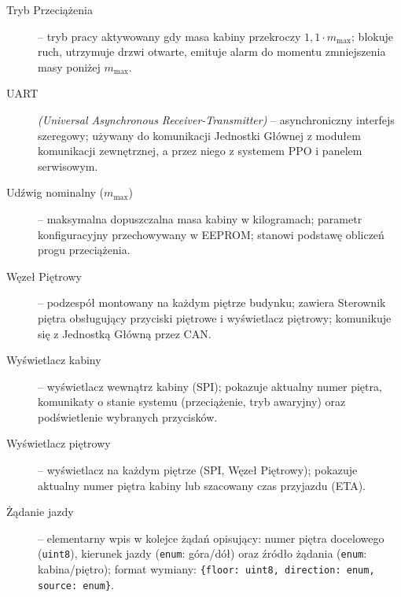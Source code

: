 \documentclass{article}
\begin{document}
\begin{description}
  \item[Tryb Przeciążenia] – tryb pracy aktywowany gdy masa kabiny przekroczy $1{,}1 \cdot m_\text{max}$; blokuje ruch, utrzymuje drzwi otwarte, emituje alarm do momentu zmniejszenia masy poniżej $m_\text{max}$.

  \item[UART] \textit{(Universal Asynchronous Receiver-Transmitter)} – asynchroniczny interfejs szeregowy; używany do komunikacji Jednostki Głównej z modułem komunikacji zewnętrznej, a przez niego z systemem PPO i panelem serwisowym.

  \item[Udźwig nominalny ($m_\text{max}$)] – maksymalna dopuszczalna masa kabiny w kilogramach; parametr konfiguracyjny przechowywany w EEPROM; stanowi podstawę obliczeń progu przeciążenia.

  \item[Węzeł Piętrowy] – podzespół montowany na każdym piętrze budynku; zawiera Sterownik piętra obsługujący przyciski piętrowe i wyświetlacz piętrowy; komunikuje się z Jednostką Główną przez CAN.

  \item[Wyświetlacz kabiny] – wyświetlacz wewnątrz kabiny (SPI); pokazuje aktualny numer piętra, komunikaty o stanie systemu (przeciążenie, tryb awaryjny) oraz podświetlenie wybranych przycisków.

  \item[Wyświetlacz piętrowy] – wyświetlacz na każdym piętrze (SPI, Węzeł Piętrowy); pokazuje aktualny numer piętra kabiny lub szacowany czas przyjazdu (ETA).

  \item[Żądanie jazdy] – elementarny wpis w kolejce żądań opisujący: numer piętra docelowego (\texttt{uint8}), kierunek jazdy (\texttt{enum}: góra/dół) oraz źródło żądania (\texttt{enum}: kabina/piętro); format wymiany: \texttt{\{floor: uint8, direction: enum, source: enum\}}.

\end{description}
\end{document}
